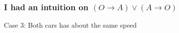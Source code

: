 \documentclass[slidestop,compress,mathserif]{beamer}
\newcommand{\ej}[2]{#1} %
\begin{document}
 \begin{frame}
  \ej{
  \frametitle{I had an intuition on $(O\rightarrow
  A)\lor (A\rightarrow O)$}
  }
  {
  \frametitle{ダメット公理$(O\rightarrow  A)\lor (A\rightarrow O)$の計算
  的解釈}
  }

  \ej
  { Case 3: Both cars has about the same speed}
  { 場合3: 両方だいたい揃って動く場合}

\end{frame}
\end{document}
